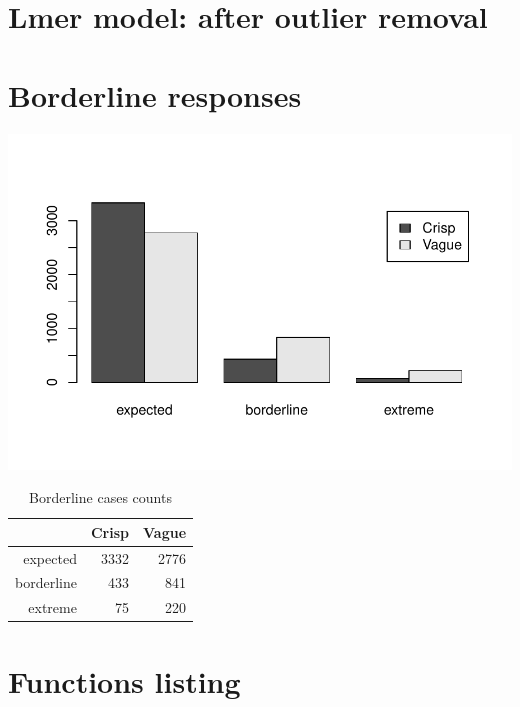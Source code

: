 \documentclass[a4paper,12pt,twoside]{article}\usepackage[]{graphicx}\usepackage[]{color}
\makeatletter
\def\maxwidth{ %
  \ifdim\Gin@nat@width>\linewidth
    \linewidth
  \else
    \Gin@nat@width
  \fi
}
\newenvironment{knitrout}{}{} %
\makeatother
\begin{document}
\clearpage
\section{Lmer model: after outlier removal}

\clearpage
\section{Borderline responses}

\begin{knitrout}\scriptsize
{}\color{fgcolor}

{\centering \includegraphics[width=\maxwidth]{figure/graphics-barplotBorderline-1} 

}



\end{knitrout}

\begin{table}[htbp]
\centering
\begingroup\small
\begin{tabular}{rrr}
  \hline
 & Crisp & Vague \\ 
  \hline
expected & 3332 & 2776 \\ 
  borderline & 433 & 841 \\ 
  extreme &  75 & 220 \\ 
   \hline
\end{tabular}
\endgroup
\caption{Borderline cases counts} 
\end{table}


\clearpage
\appendix
\section{Functions listing}
\clearpage
\end{document}

